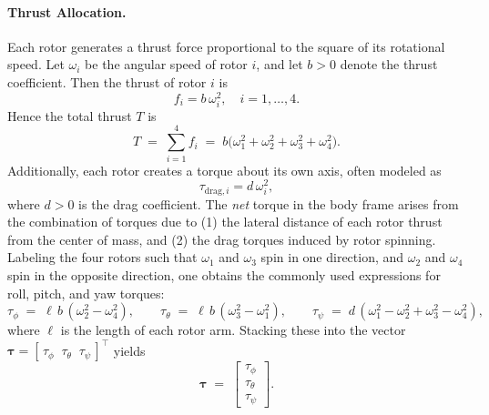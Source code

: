 \documentclass[12pt,twoside,letterpaper]{article}
\begin{document}
\paragraph{Thrust Allocation.} 
Each rotor generates a thrust force proportional to the square of its rotational speed. Let $\omega_i$ be the angular speed of rotor $i$, and let $b>0$ denote the thrust coefficient. Then the thrust of rotor $i$ is 
\begin{equation}
f_i = b\,\omega_i^2, 
\quad i=1,\dots,4.
\end{equation}
Hence the total thrust $T$ is
\begin{equation}
    T \;=\; \sum_{i=1}^{4} f_i 
    \;=\; b\bigl(\omega_1^2 + \omega_2^2 + \omega_3^2 + \omega_4^2 \bigr).
    \label{eq:total_thrust}
\end{equation}
Additionally, each rotor creates a torque about its own axis, often modeled as 
\begin{equation}
\tau_{\mathrm{drag},i} = d\,\omega_i^2,
\end{equation}
where $d>0$ is the drag coefficient. The \emph{net} torque in the body frame arises from the combination of torques due to (1) the lateral distance of each rotor thrust from the center of mass, and (2) the drag torques induced by rotor spinning. Labeling the four rotors such that $\omega_1$ and $\omega_3$ spin in one direction, and $\omega_2$ and $\omega_4$ spin in the opposite direction, one obtains the commonly used expressions for roll, pitch, and yaw torques:
\begin{equation}
    \tau_{\phi} \;=\; \ell\,b\,(\omega_2^2 - \omega_4^2), 
    \qquad
    \tau_{\theta} \;=\; \ell\,b\,(\omega_3^2 - \omega_1^2), 
    \qquad
    \tau_{\psi} \;=\; d\,(\omega_1^2 - \omega_2^2 + \omega_3^2 - \omega_4^2),
\end{equation}
where $\ell$ is the length of each rotor arm. Stacking these into the vector $\boldsymbol{\tau} = [\,\tau_{\phi}\;\;\tau_{\theta}\;\;\tau_{\psi}\,]^\top$ yields
\begin{equation}
    \boldsymbol{\tau} 
    \;=\;
    \begin{bmatrix}
    \tau_{\phi} \\
    \tau_{\theta} \\
    \tau_{\psi}
    \end{bmatrix}.
\end{equation}
\end{document}
